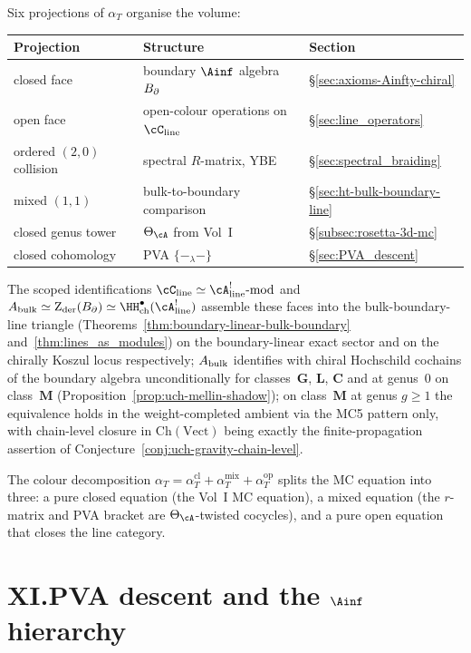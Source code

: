 Six projections of $\alpha_T$ organise the volume:
\begin{center}
\small
\renewcommand{\arraystretch}{1.15}
\begin{tabular}{lll}
\textbf{Projection} & \textbf{Structure} & \textbf{Section} \\
\hline
closed face
 & boundary $\Ainf$ algebra $B_{\partial}$
 & \S\ref{sec:axioms-Ainfty-chiral} \\[2pt]
open face
 & open-colour operations on $\cC_{\mathrm{line}}$
 & \S\ref{sec:line_operators} \\[2pt]
ordered $(2,0)$ collision
 & spectral $R$-matrix, YBE
 & \S\ref{sec:spectral_braiding} \\[2pt]
mixed $(1,1)$
 & bulk-to-boundary comparison
 & \S\ref{sec:ht-bulk-boundary-line} \\[2pt]
closed genus tower
 & $\Theta_\cA$ from Vol~I
 & \S\ref{subsec:rosetta-3d-mc} \\[2pt]
closed cohomology
 & PVA $\{-_\lambda -\}$
 & \S\ref{sec:PVA_descent}
\end{tabular}
\end{center}
The scoped identifications
$\cC_{\mathrm{line}} \simeq \cA^!_{\mathrm{line}}\text{-mod}$ and
$\Abulk \simeq \Zder(\Bbound)
\simeq \HH^\bullet_{\mathrm{ch}}(\cA^!_{\mathrm{line}})$
assemble these faces into the bulk-boundary-line triangle
(Theorems~\ref{thm:boundary-linear-bulk-boundary}
and~\ref{thm:lines_as_modules}) on the boundary-linear exact
sector and on the chirally Koszul locus respectively;
$A_{\mathrm{bulk}}$ identifies with chiral Hochschild cochains of the
boundary algebra unconditionally for classes~$\mathbf{G}$,
$\mathbf{L}$, $\mathbf{C}$ and at genus~$0$ on class~$\mathbf{M}$
(Proposition~\ref{prop:uch-mellin-shadow}); on class~$\mathbf{M}$
at genus $g \geq 1$ the equivalence holds in the weight-completed
ambient via the MC5 pattern only, with chain-level closure in
$\mathrm{Ch}(\mathrm{Vect})$ being exactly the finite-propagation
assertion of
Conjecture~\ref{conj:uch-gravity-chain-level}.

The colour decomposition
$\alpha_T = \alpha_T^{\mathrm{cl}} + \alpha_T^{\mathrm{mix}}
+ \alpha_T^{\mathrm{op}}$ splits the MC equation into three: a
pure closed equation (the Vol~I MC equation), a mixed equation
(the $r$-matrix and PVA bracket are $\Theta_\cA$-twisted
cocycles), and a pure open equation that closes the line
category.

\section*{XI.\quad PVA descent and the $\Ainf$ hierarchy}
\label{sec:preface-pva-descent}

